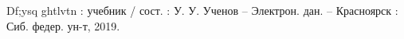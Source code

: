 
\renewcommand{\bibname}{Библиографический список}
\begin{thebibliography}{99}

Df;ysq ghtlvtn : учебник / сост. : У. У. Ученов -- Электрон. дан. -- Красноярск : Сиб. федер. ун-т, 2019.

\end{thebibliography}